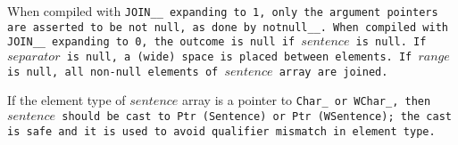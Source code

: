 When compiled with \tt{JOIN__} expanding to \tt{1}, only the argument
pointers are asserted to be not null, as done by \tt{notnull__}.
When compiled with \tt{JOIN__} expanding to \tt{0},
the outcome is null if $sentence$ is null.
If $separator$ is null, a (wide) space is placed between elements.
If $range$ is null, all non-null elements of $sentence$ array are joined.

\note If the element type of $sentence$ array is a pointer
to \tt{Char_} or \tt{WChar_}, then $sentence$ should be cast
to \tt{Ptr (Sentence)} or \tt{Ptr (WSentence)}; the cast is
safe and it is used to avoid qualifier mismatch in element type.
